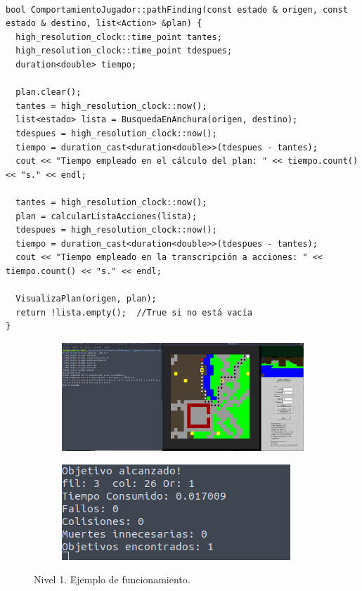 \documentclass[12pt,spanish]{article}
\begin{document}
\begin{verbatim}

bool ComportamientoJugador::pathFinding(const estado & origen, const estado & destino, list<Action> &plan) {
  high_resolution_clock::time_point tantes;
  high_resolution_clock::time_point tdespues;
  duration<double> tiempo;

  plan.clear();
  tantes = high_resolution_clock::now();
  list<estado> lista = BusquedaEnAnchura(origen, destino);
  tdespues = high_resolution_clock::now();
  tiempo = duration_cast<duration<double>>(tdespues - tantes);
  cout << "Tiempo empleado en el cálculo del plan: " << tiempo.count() << "s." << endl;

  tantes = high_resolution_clock::now();
  plan = calcularListaAcciones(lista);
  tdespues = high_resolution_clock::now();
  tiempo = duration_cast<duration<double>>(tdespues - tantes);
  cout << "Tiempo empleado en la transcripción a acciones: " << tiempo.count() << "s." << endl;

  VisualizaPlan(origen, plan);
  return !lista.empty();  //True si no está vacía
}

\end{verbatim}

\begin{figure}[H]
\centering
\begin{subfigure}[H]{0.85\textwidth}
\includegraphics[width=\textwidth]{nivel_1_1.png}
\end{subfigure}
\vspace{1cm}
\begin{subfigure}[H]{0.85\textwidth}
\includegraphics[width=\textwidth]{nivel_1_2.png}
\end{subfigure}
\caption{Nivel 1. Ejemplo de funcionamiento.}
\end{figure}
\end{document}
